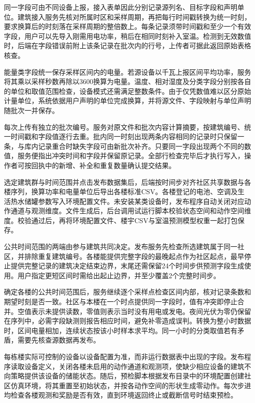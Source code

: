 同一字段可由不同设备上报，接入表单因此分别记录源列名、目标字段和声明单位。建筑接入服务先核对所属时区和采样周期，再把每行时间戳转换为统一时刻，要求换算后的时刻落在采样周期的整倍数上。每条记录须带时间戳和至少一个有效字段，用户可以先导入刚需用电功率，稍后在相同时刻补入室温。检测到无效数值时，后端在字段错误前附上该条记录在批次内的行号，上传者可据此返回原始表格核查。

能量类字段统一保存采样区间内的电量。若源设备以千瓦上报区间平均功率，服务将其乘以采样秒数再除以3600换算为电量。温度、相对湿度及分类字段分别按各自的单位和取值范围检查，设备模式还需满足整数条件。由于仅凭数值难以区分原始计量单位，系统依据用户声明的单位完成换算，并将源文件、字段映射与单位声明随批次一并保存。

每次上传有独立的批次编号。服务对原文件和批次内容计算摘要，按建筑编号、统一时间戳和字段值逐行去重。批内同一时刻出现两条内容相同的记录时只保留一条，与库内记录重合时缺失字段可由新批次补齐。只要同一字段出现两个不同的数值，服务便指出冲突时间和字段并保留原记录。全部行检查完毕后才执行写入，操作者可按回执中的新增、补全和重复数量确认提交结果。

选定建筑群与时间范围并点击发布数据集后，后端按时间步对齐社区共享数据与各楼序列，换算功率和电量单位后导出各楼标准CSV。各楼登记的电池、空调及生活热水储罐参数写入环境配置文件。未安装某类设备时，发布程序自动关闭对应动作通道与观测维度。文件生成后，后台调用试运行脚本校验状态空间和动作空间维度。校验通过后，再将环境配置文件、楼宇CSV与室温预测模型权重一起打包保存。

公共时间范围的两端由参与建筑共同决定。发布服务先检查所选建筑属于同一社区，并排除重复建筑编号。各楼能提供完整字段的最晚起点作为社区起点，最早停止提供完整记录的建筑决定结束边界，末尾还需保留24个时间步供预测字段生成使用。用户指定更短区间时需给出起止边界，并至少覆盖2个完整时间步。

确定各楼的公共时间范围后，服务继续逐个采样点检查区间内部，核对记录条数和期望时刻是否一致。社区与本楼在一个时点提供同一字段时，值有冲突即停止合并。空值表示未提供读数，零值则表示当时没有用电或发电。夜间光伏为零仍保留在序列中，必需字段缺测则报告相应时间，避免补零造成误判。转换为整小时数据时，区间电量相加，连续状态按该小时样本求平均。同一小时的分类取值若有矛盾，需要先核查源数据再发布。

每栋楼实际可控制的设备以设备配置为准，而非运行数据表中出现的字段。发布程序读取设备定义，关闭各楼未启用的动作通道和观测项，使缺少相应设备的建筑不向策略提供该设备的储能状态。随后，预检脚本根据发布目录中的环境配置创建社区仿真环境，将其重置至初始状态，并按各动作空间的形状生成零动作。每次步进均检查各楼观测和奖励是否有效，直到环境返回终止或截断信号时结束预检。


